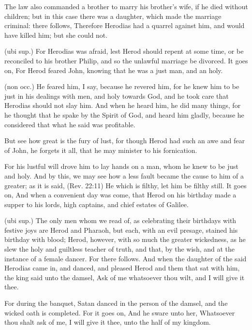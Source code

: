  The law also commanded a brother to marry his brother’s wife, if he died without children; but in this case there was a daughter, which made the marriage criminal: there follows, Therefore Herodias had a quarrel against him, and would have killed him; but she could not.

 (ubi sup.) For Herodias was afraid, lest Herod should repent at some time, or be reconciled to his brother Philip, and so the unlawful marriage be divorced. It goes on, For Herod feared John, knowing that he was a just man, and an holy.

 (non occ.) He feared him, I say, because he revered him, for he knew him to be just in his dealings with men, and holy towards God, and he took care that Herodias should not slay him. And when he heard him, he did many things, for he thought that he spake by the Spirit of God, and heard him gladly, because he considered that what he said was profitable.

 But see how great is the fury of lust, for though Herod had such an awe and fear of John, he forgets it all, that he may minister to his fornication.

 For his lustful will drove him to lay hands on a man, whom he knew to be just and holy. And by this, we may see how a less fault became the cause to him of a greater; as it is said, (Rev. 22:11) He which is filthy, let him be filthy still. It goes on, And when a convenient day was come, that Herod on his birthday made a supper to his lords, high captains, and chief estates of Galilee.

 (ubi sup.) The only men whom we read of, as celebrating their birthdays with festive joys are Herod and Pharaoh, but each, with an evil presage, stained his birthday with blood; Herod, however, with so much the greater wickedness, as he slew the holy and guiltless teacher of truth, and that, by the wish, and at the instance of a female dancer. For there follows. And when the daughter of the said Herodias came in, and danced, and pleased Herod and them that sat with him, the king said unto the damsel, Ask of me whatsoever thou wilt, and I will give it thee.

 For during the banquet, Satan danced in the person of the damsel, and the wicked oath is completed. For it goes on, And he sware unto her, Whatsoever thou shalt ask of me, I will give it thee, unto the half of my kingdom.

